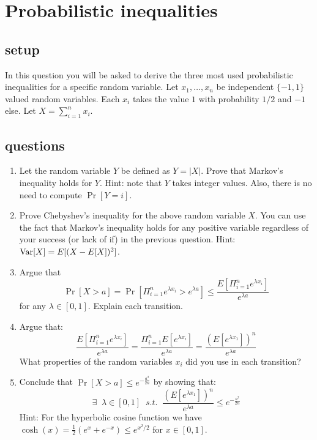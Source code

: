 \documentclass{article}
\begin{document}


\section{Probabilistic inequalities}
\subsection*{setup}
In this question you will be asked to derive the three most used
probabilistic inequalities for a specific random variable. Let
$x_1,\ldots,x_n$ be independent $\{-1,1\}$ valued random variables.
Each $x_i$ takes the value $1$ with probability $1/2$ and $-1$ else.
Let $X = \sum_{i=1}^{n}x_i$.

\subsection*{questions}
\begin{enumerate}
\item Let the random variable $Y$ be defined as $Y = |X|$.
Prove that Markov's inequality holds for $Y$. Hint: note that $Y$
takes integer values. Also, there is no need to compute $\Pr[Y =
i]$.
\item Prove Chebyshev's inequality for the above random variable
$X$. You can use the fact that Markov's inequality holds for any
positive variable regardless of your success (or lack of if) in the
previous question. Hint: ${\operatorname{Var}}[X] = E[(X-E[X])^2]$.
\item Argue that
\[
\Pr[X > a] = \Pr[\Pi_{i=1}^{n}e^{\lambda x_i} > e^{\lambda a}] \le
\frac{E[\Pi_{i=1}^{n}e^{\lambda x_i}]}{e^{\lambda a}}
\]
for any $\lambda \in [0,1]$. Explain each transition.
\item Argue that:
\[
\frac{E[\Pi_{i=1}^{n}e^{\lambda x_i}]}{e^{\lambda a}} =
\frac{\Pi_{i=1}^{n}E[e^{\lambda x_i}]}{e^{\lambda a}} =
\frac{(E[e^{\lambda x_1}])^n}{e^{\lambda a}}
\]
What properties of the random variables $x_i$ did you use in each
transition?
\item Conclude that $\Pr[X > a] \le e^{-\frac{a^2}{2n}}$ by
showing that:
\[
\exists \;\;\lambda\in [0,1] \;\;s.t. \;\; \frac{(E[e^{\lambda
x_1}])^n}{e^{\lambda a}} \le e^{-\frac{a^2}{2n}}
\]
Hint: For the hyperbolic cosine function we have $\cosh(x) =
\frac{1}{2}(e^{x} + e^{-x}) \le e^{x^2/2}$ for $x \in [0,1]$.
\end{enumerate}
\pagebreak
\end{document}
